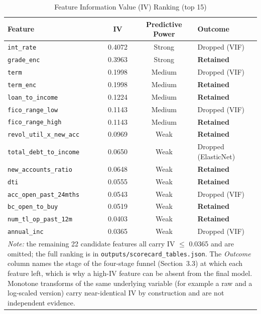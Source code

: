 \documentclass[11pt,a4paper]{article}
\begin{document}
\begin{table}[H]
\centering
\small
\caption{Feature Information Value (IV) Ranking (top 15)}
\label{tab:iv_ranking}
\vspace{0.5em}
\begin{tabular}{lccl}
\toprule
\textbf{Feature} & \textbf{IV} & \textbf{Predictive Power} & \textbf{Outcome} \\
\midrule
\texttt{int\_rate} & 0.4072 & Strong & Dropped (VIF) \\
\texttt{grade\_enc} & 0.3963 & Strong & \textbf{Retained} \\
\texttt{term} & 0.1998 & Medium & Dropped (VIF) \\
\texttt{term\_enc} & 0.1998 & Medium & \textbf{Retained} \\
\texttt{loan\_to\_income} & 0.1224 & Medium & \textbf{Retained} \\
\texttt{fico\_range\_low} & 0.1143 & Medium & Dropped (VIF) \\
\texttt{fico\_range\_high} & 0.1143 & Medium & \textbf{Retained} \\
\texttt{revol\_util\_x\_new\_acc} & 0.0969 & Weak & \textbf{Retained} \\
\texttt{total\_debt\_to\_income} & 0.0650 & Weak & Dropped (ElasticNet) \\
\texttt{new\_accounts\_ratio} & 0.0648 & Weak & \textbf{Retained} \\
\texttt{dti} & 0.0555 & Weak & \textbf{Retained} \\
\texttt{acc\_open\_past\_24mths} & 0.0543 & Weak & Dropped (VIF) \\
\texttt{bc\_open\_to\_buy} & 0.0519 & Weak & \textbf{Retained} \\
\texttt{num\_tl\_op\_past\_12m} & 0.0403 & Weak & \textbf{Retained} \\
\texttt{annual\_inc} & 0.0365 & Weak & Dropped (VIF) \\
\bottomrule
\multicolumn{4}{p{0.92\linewidth}}{\footnotesize \textit{Note:} the remaining 22 candidate features all carry IV $\le$ 0.0365 and are omitted; the full ranking is in \texttt{outputs/scorecard\_tables.json}. The \textit{Outcome} column names the stage of the four-stage funnel (Section~3.3) at which each feature left, which is why a high-IV feature can be absent from the final model. Monotone transforms of the same underlying variable (for example a raw and a log-scaled version) carry near-identical IV by construction and are not independent evidence.} \\
\end{tabular}
\end{table}
\end{document}
